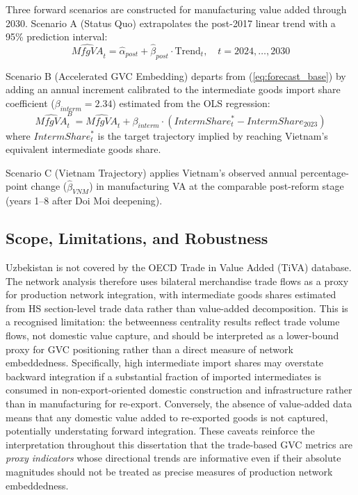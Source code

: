 Three forward scenarios are constructed for manufacturing value added through 2030. Scenario A (Status Quo) extrapolates the post-2017 linear trend with a 95\% prediction interval:
\begin{equation}
 \widehat{MfgVA}_t = \hat{\alpha}_{post} + \hat{\beta}_{post} \cdot \text{Trend}_t, \quad t = 2024, \ldots, 2030
 \label{eq:forecast_base}
\end{equation}

Scenario B (Accelerated GVC Embedding) departs from (\ref{eq:forecast_base}) by adding an annual increment calibrated to the intermediate goods import share coefficient ($\beta_{interm} = 2.34$) estimated from the OLS regression:
\begin{equation}
 \widehat{MfgVA}^B_t = \widehat{MfgVA}_t + \beta_{interm} \cdot (IntermShare^*_t - IntermShare_{2023})
 \label{eq:forecast_b}
\end{equation}
where $IntermShare^*_t$ is the target trajectory implied by reaching Vietnam's equivalent intermediate goods share.

Scenario C (Vietnam Trajectory) applies Vietnam's observed annual percentage-point change ($\hat{\beta}_{VNM}$) in manufacturing VA at the comparable post-reform stage (years 1--8 after Doi Moi deepening).

\subsection{Scope, Limitations, and Robustness}

Uzbekistan is not covered by the OECD Trade in Value Added (TiVA) database. The network analysis therefore uses bilateral merchandise trade flows as a proxy for production network integration, with intermediate goods shares estimated from HS section-level trade data rather than value-added decomposition. This is a recognised limitation: the betweenness centrality results reflect trade volume flows, not domestic value capture, and should be interpreted as a lower-bound proxy for GVC positioning rather than a direct measure of network embeddedness. Specifically, high intermediate import shares may overstate backward integration if a substantial fraction of imported intermediates is consumed in non-export-oriented domestic construction and infrastructure rather than in manufacturing for re-export. Conversely, the absence of value-added data means that any domestic value added to re-exported goods is not captured, potentially understating forward integration. These caveats reinforce the interpretation throughout this dissertation that the trade-based GVC metrics are \textit{proxy indicators} whose directional trends are informative even if their absolute magnitudes should not be treated as precise measures of production network embeddedness.

